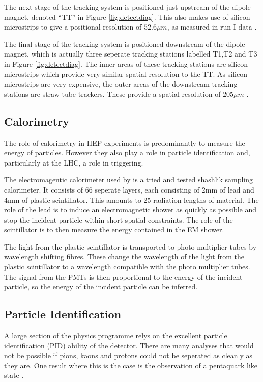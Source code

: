  The next stage of the \lhcb tracking system is positioned just upstream of the dipole magnet, denoted ``TT'' in Figure \ref{fig:detectdiag}.  This also makes use of silicon microstrips to give a positional resolution of $52.6 \mu m$, as measured in run I data \cite{Aaij:1978280}.

The final stage of the tracking system is positioned downstream of the dipole magnet, which is actually three seperate tracking stations labelled T1,T2 and T3 in Figure \ref{fig:detectdiag}.  The inner areas of these tracking stations are silicon microstrips which provide very similar spatial resolution to the TT.  As silicon microstrips are very expensive, the outer areas of the downstream tracking stations are straw tube trackers.  These provide a spatial resolution of $205 \mu m$ \cite{Aaij:1978280}.

 
\subsection{Calorimetry}
\label{sec:Calorimetry}
The role of calorimetry in HEP experiments is predominantly to measure the energy of particles.  However they also play a role in particle identification and, particularly at the LHC, a role in triggering.

The electromagentic calorimeter used by \lhcb is a tried and tested shashlik sampling calorimeter.  It consists of 66 seperate layers, each consisting of 2mm of lead and 4mm of plastic scintillator.  This amounts to 25 radiation lengths of material.  The role of the lead is to induce an electromagnetic shower as quickly as possible and stop the incident particle within short spatial constraints.  The role of the scintillator is to then measure the energy contained in the EM shower.

The light from the plastic scintillator is transported to photo multiplier tubes by wavelength shifting fibres.  These change the wavelength of the light from the plastic scintillator to a wavelength compatible with the photo multiplier tubes.  The signal from the PMTs is then proportional to the energy of the incident particle, so the energy of the incident particle can be inferred.

\subsection{Particle Identification}
\label{sec:Particle Identification}
A large section of the \lhcb physics programme relys on the excellent particle identification (PID) ability of the \lhcb detector.  There are many analyses that would not be possible if pions, kaons and protons could not be seperated as cleanly as they are. One result where this is the case is the observation of a pentaquark like state \cite{LHCb-PAPER-2015-029}.


